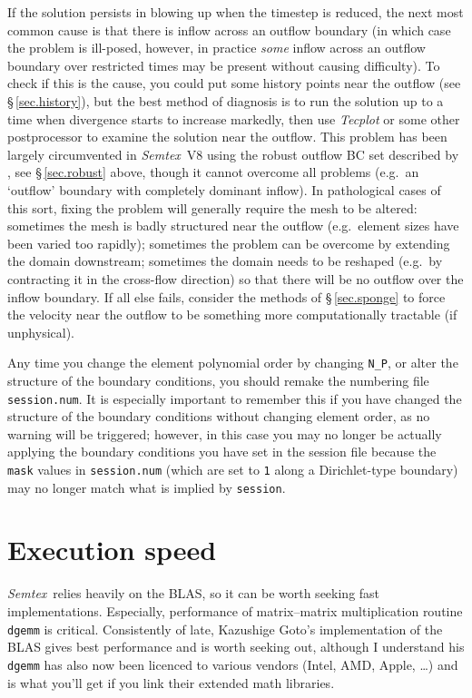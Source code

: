 \documentclass[11pt]{report}
\newcommand{\Semtex}{\emph{Semtex}} \newcommand{\Dog}{\emph{Dog}}
\newcommand{\eg}{e.g.\ } \newcommand{\CC}{\mathrm{c.c.}}
\begin{document}
If the solution persists in blowing up when the timestep is reduced,
the next most common cause is that there is inflow across an outflow
boundary (in which case the problem is ill-posed, however, in practice
\emph{some} inflow across an outflow boundary over restricted times
may be present without causing difficulty). To check if this is the
cause, you could put some history points near the outflow (see
\S\,\ref{sec.history}), but the best method of diagnosis is to run the
solution up to a time when divergence starts to increase markedly,
then use \emph{Tecplot} or some other postprocessor to examine the
solution near the outflow.  This problem has been largely circumvented
in \Semtex~V8 using the robust outflow BC set described by
\citet{dkc14}, see \S\,\ref{sec.robust} above, though it cannot
overcome all problems (\eg an `outflow' boundary with completely
dominant inflow).  In pathological cases of this sort, fixing the
problem will generally require the mesh to be altered: sometimes the
mesh is badly structured near the outflow (\eg element sizes have been
varied too rapidly); sometimes the problem can be overcome by
extending the domain downstream; sometimes the domain needs to be
reshaped (\eg by contracting it in the cross-flow direction) so that
there will be no outflow over the inflow boundary. If all else fails,
consider the methods of \S\,\ref{sec.sponge} to force the velocity
near the outflow to be something more computationally tractable (if
unphysical).

Any time you change the element polynomial order by changing
\verb+N_P+, or alter the structure of the boundary conditions, you
should remake the numbering file \verb+session.num+. It is especially
important to remember this if you have changed the structure of the
boundary conditions without changing element order, as no warning will
be triggered; however, in this case you may no longer be actually
applying the boundary conditions you have set in the session file
because the \verb+mask+ values in \texttt{session.num} (which are set
to \verb+1+ along a Dirichlet-type boundary) may no longer match what
is implied by \texttt{session}.

\section{Execution speed}
\label{sec.speed}

\Semtex\ relies heavily on the BLAS, so it can be worth seeking fast
implementations. Especially, performance of matrix--matrix
multiplication routine \verb+dgemm+ is critical. Consistently of late,
Kazushige Goto's implementation of the BLAS gives best performance and
is worth seeking out, although I understand his \verb+dgemm+ has also
now been licenced to various vendors (Intel, AMD, Apple, \ldots) and
is what you'll get if you link their extended math libraries.
\end{document}
